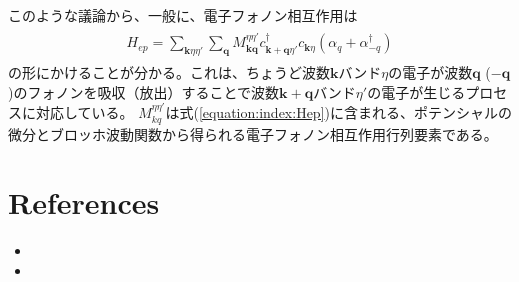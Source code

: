 \documentclass[letterpaper,10pt,dvipdfmx]{sphinxhowto}
\begin{document}
このような議論から、一般に、電子フォノン相互作用は
\begin{equation*}
\begin{split}\begin{aligned}
H_{ep} =
\sum_{\mathbf{k}\eta\eta'}{\sum_{\mathbf{q}}^{}M_{\mathbf{kq}}^{\eta\eta'}}c_{\mathbf{k
+ q}\eta'}^{\dagger}c_{\mathbf{k}\eta}\left(\alpha_q+ \alpha_{-q}^{\dagger} \right)\end{aligned}\end{split}
\end{equation*}
の形にかけることが分かる。これは、ちょうど波数\(\mathbf{k}\)バンド\(\eta\)の電子が波数\(\mathbf{q}\)
(\(- \mathbf{q}\))のフォノンを吸収（放出）することで波数\(\mathbf{k + q}\)バンド\(\eta'\)の電子が生じるプロセスに対応している。
\(M_{kq}^{\eta\eta'}\)は式(\eqref{equation:index:Hep})に含まれる、ポテンシャルの微分とブロッホ波動関数から得られる電子フォノン相互作用行列要素である。


\section{References}
\label{\detokenize{index:references}}\begin{itemize}
\item {} 

\item {} 

\end{itemize}



\renewcommand{\indexname}{索引}
\printindex
\end{document}
